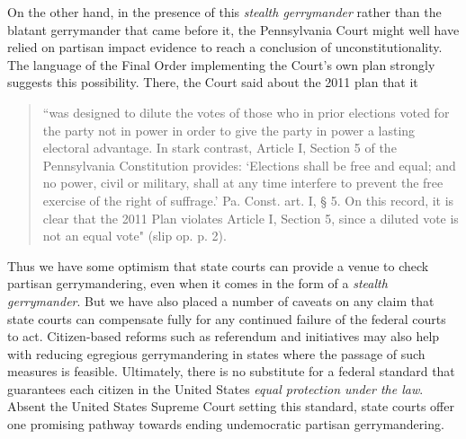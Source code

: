     On the other hand, in the presence of this \textit{stealth gerrymander} rather than the blatant gerrymander that came before it, the Pennsylvania Court might well have relied on partisan impact evidence to reach a conclusion of unconstitutionality. The language of the Final Order implementing the Court's own plan strongly suggests this possibility. There, the Court said about the 2011 plan that it 
    \begin{quote}
        ``was designed to dilute the votes of those who in prior elections voted for the party not in power in order to give the party in power a lasting electoral advantage. In stark contrast, Article I, Section 5 of the Pennsylvania Constitution provides: ‘Elections shall be free and equal; and no power, civil or military, shall at any time interfere to prevent the free exercise of the right of suffrage.’ Pa. Const. art. I, § 5. On this record, it is clear that the 2011 Plan violates Article I, Section 5, since a diluted vote is not an equal vote" (slip op. p. 2).
    \end{quote}
\par
	Thus we have some optimism that state courts can provide a venue to check partisan gerrymandering, even when it comes in the form of a \textit{stealth gerrymander}. But we have also placed a number of caveats on any claim that state courts can compensate fully for any continued failure of the federal courts to act. Citizen-based reforms such as referendum and initiatives may also help with reducing egregious gerrymandering in states where the passage of such measures is feasible. Ultimately, there is no substitute for a federal standard that guarantees each citizen in the United States \textit{equal protection under the law}. Absent the United States Supreme Court setting this standard, state courts offer one promising pathway towards ending undemocratic partisan gerrymandering.

% 
% 
% 
% 
% 
    
    
    
    
    
